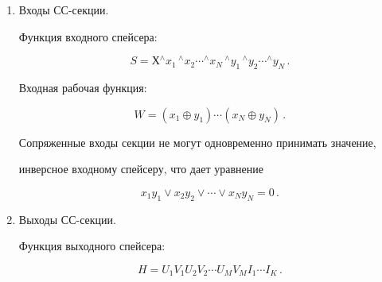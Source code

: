    \begin{enumerate}[1.]


   \item  Входы СС-секции.


   


   Функция входного спейсера:


   \begin{equation}


   S = Х{^\wedge x_1}\,  {^\wedge  x_2} \cdots {^\wedge x_N} \,


   {^\wedge y_1}\, {^\wedge y_2} \cdots 


{^\wedge y_N}\,.


   \label{e1-pl}


   \end{equation}


   Входная рабочая функция:


   \begin{equation}


   W = \left(x_1 \oplus  y_1\right) \cdots  \left(x_N \oplus  y_N\right)\,.


   \label{e2-pl}


   \end{equation}


   


   Сопряженные входы секции не могут одновременно принимать значение, 


инверсное входному спейсеру, что дает уравнение


   \begin{equation}


   x_1 y_1 \vee x_2 y_2 \vee \cdots  \vee x_N y_N = 0\,.


   \label{e3-pl}


   \end{equation}


   \item Выходы СС-секции.


   


   Функция выходного спейсера:


   \begin{equation}


   H = U_1 V_1 U_2 V_2 \cdots  U_M V_M I_1 \cdots  I_K\,.


   \label{e4-pl}


   \end{equation}



\end{enumerate}
